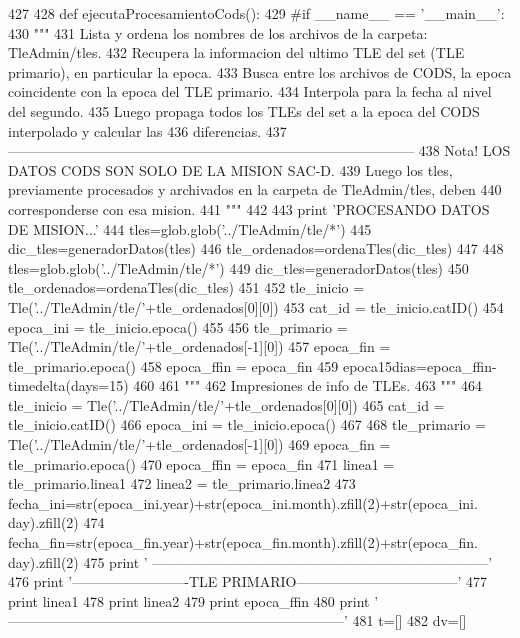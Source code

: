 \begin{DoxyCode}
427 
428 def ejecutaProcesamientoCods():
429 #if __name__ == '__main__':
430     """
431     Lista y ordena los nombres de los archivos de la carpeta: TleAdmin/tles.
432     Recupera la informacion del ultimo TLE del set (TLE primario), en
       particular la epoca.
433     Busca entre los archivos de CODS, la epoca coincidente con la epoca del TLE
       primario.
434     Interpola para la fecha al nivel del segundo. 
435     Luego propaga todos los TLEs del set a la epoca del CODS interpolado y
       calcular las 
436     diferencias. 
437    
       ---------------------------------------------------------------------------------------
438     Nota! LOS DATOS CODS SON SOLO DE LA MISION SAC-D.
439     Luego los tles, previamente procesados y archivados en la carpeta de
       TleAdmin/tles, deben
440     corresponderse con esa mision.
441     """
442 
443     print 'PROCESANDO DATOS DE MISION...'
444     tles=glob.glob('../TleAdmin/tle/*')
445     dic_tles=generadorDatos(tles)
446     tle_ordenados=ordenaTles(dic_tles)
447     
448     tles=glob.glob('../TleAdmin/tle/*')
449     dic_tles=generadorDatos(tles)
450     tle_ordenados=ordenaTles(dic_tles)
451     
452     tle_inicio = Tle('../TleAdmin/tle/'+tle_ordenados[0][0])
453     cat_id = tle_inicio.catID()
454     epoca_ini = tle_inicio.epoca()
455     
456     tle_primario = Tle('../TleAdmin/tle/'+tle_ordenados[-1][0])
457     epoca_fin  = tle_primario.epoca()
458     epoca_ffin = epoca_fin
459     epoca15dias=epoca_ffin-timedelta(days=15)
460     
461     """
462     Impresiones de info de TLEs.
463     """
464     tle_inicio = Tle('../TleAdmin/tle/'+tle_ordenados[0][0])
465     cat_id = tle_inicio.catID()
466     epoca_ini = tle_inicio.epoca()
467     
468     tle_primario = Tle('../TleAdmin/tle/'+tle_ordenados[-1][0])
469     epoca_fin  = tle_primario.epoca()
470     epoca_ffin = epoca_fin
471     linea1 = tle_primario.linea1
472     linea2 = tle_primario.linea2
473     fecha_ini=str(epoca_ini.year)+str(epoca_ini.month).zfill(2)+str(epoca_ini.
      day).zfill(2)
474     fecha_fin=str(epoca_fin.year)+str(epoca_fin.month).zfill(2)+str(epoca_fin.
      day).zfill(2)
475     print '
      ------------------------------------------------------------------------'
476     print '-------------------------TLE
       PRIMARIO-----------------------------------'
477     print linea1
478     print linea2
479     print epoca_ffin
480     print '
      ------------------------------------------------------------------------'
481     t=[]
482     dv=[]

\end{DoxyCode}
